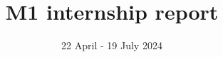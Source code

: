 \title{M1 internship report}
\subject{Lower bounds under \textsc{SETH} and algorithms for known NP-hard problems on graphs parameterized by a hierarchy of parameters, from vertex cover number to treewidth}
\date{22 April - 19 July 2024}

\maketitle